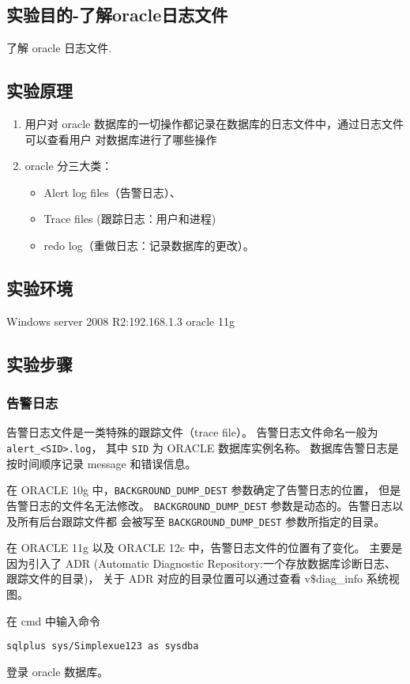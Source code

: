 \subsection{实验目的-了解oracle日志文件}
了解 oracle 日志文件.
%
\subsection{实验原理}
\begin{enumerate}
  \item 用户对 oracle 数据库的一切操作都记录在数据库的日志文件中，通过日志文件可以查看用户
    对数据库进行了哪些操作
  \item oracle 分三大类：
    \begin{itemize}
      \item Alert log files（告警日志）、
      \item Trace files (跟踪日志：用户和进程)
      \item redo log（重做日志：记录数据库的更改）。
    \end{itemize}
\end{enumerate}
%
\subsection{实验环境}
Windows server 2008 R2:192.168.1.3 oracle 11g
%
\subsection{实验步骤}
\subsubsection{告警日志}
告警日志文件是一类特殊的跟踪文件（trace file）。
告警日志文件命名一般为 \texttt{alert\_<SID>.log}，
其中 \texttt{SID} 为 ORACLE 数据库实例名称。
数据库告警日志是按时间顺序记录 message 和错误信息。

在 ORACLE 10g 中，\texttt{BACKGROUND\_DUMP\_DEST} 参数确定了告警日志的位置，
但是告警日志的文件名无法修改。
\texttt{BACKGROUND\_DUMP\_DEST} 参数是动态的。告警日志以及所有后台跟踪文件都
会被写至 \texttt{BACKGROUND\_DUMP\_DEST} 参数所指定的目录。

在 ORACLE 11g 以及 ORACLE 12c 中，告警日志文件的位置有了变化。
主要是因为引入了 ADR
(Automatic Diagnostic Repository:一个存放数据库诊断日志、跟踪文件的目录)，
关于 ADR 对应的目录位置可以通过查看 v\$diag\_info 系统视图。

在 cmd 中输入命令
\begin{verbatim}
sqlplus sys/Simplexue123 as sysdba
\end{verbatim}
登录 oracle 数据库。


